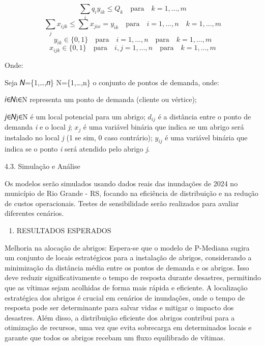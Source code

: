 \documentclass[
]{article}
\providecommand{\tightlist}{%
  \setlength{\itemsep}{0pt}\setlength{\parskip}{0pt}}
\begin{document}
\[\sum_{i}q_{i}y_{ik} \leq Q_{k} \quad \text{para} \quad  k=1, \dots,m\]
\[\sum_{j}x_{ijk} \leq\sum x_{jix}=y_{ik} \quad \text{para}\quad i=1,\dots,n\quad k=1,\dots,m\]
\[y_{ik} \in \{0,1\}\quad\text{para}\quad i=1,\dots,n\quad\text{para}\quad k=1,\dots,m\]
\[x_{ijk} \in \{0,1\}\quad\text{para}\quad i,j=1,\dots,n\quad\text{para}\quad k=1,\dots,m\]

Onde:

Seja 𝑁=\{1,\ldots,𝑛\} N=\{1,\ldots,n\} o conjunto de pontos de demanda,
onde:

𝑖∈𝑁i∈N representa um ponto de demanda (cliente ou vértice);

𝑗∈𝑁j∈N é um local potencial para um abrigo; \(d_{ij}\) é a distância
entre o ponto de demanda \emph{i} e o local \emph{j}; \(x_{j}\) é uma
variável binária que indica se um abrigo será instalado no local
\emph{j} (1 se sim, 0 caso contrário); \(y_{ij}\) é uma variável binária
que indica se o ponto \emph{i} será atendido pelo abrigo \emph{j}.

4.3. Simulação e Análise

Os modelos serão simulados usando dados reais das inundações de 2024 no
município de Rio Grande - RS, focando na eficiência de distribuição e na
redução de custos operacionais. Testes de sensibilidade serão realizados
para avaliar diferentes cenários.

\begin{enumerate}
\def\labelenumi{\arabic{enumi}.}
\setcounter{enumi}{4}
\tightlist
\item
  RESULTADOS ESPERADOS
\end{enumerate}

Melhoria na alocação de abrigos: Espera-se que o modelo de P-Mediana
sugira um conjunto de locais estratégicos para a instalação de abrigos,
considerando a minimização da distância média entre os pontos de demanda
e os abrigos. Isso deve reduzir significativamente o tempo de resposta
durante desastres, permitindo que as vítimas sejam acolhidas de forma
mais rápida e eficiente. A localização estratégica dos abrigos é crucial
em cenários de inundações, onde o tempo de resposta pode ser
determinante para salvar vidas e mitigar o impacto dos desastres. Além
disso, a distribuição eficiente dos abrigos contribui para a otimização
de recursos, uma vez que evita sobrecarga em determinados locais e
garante que todos os abrigos recebam um fluxo equilibrado de vítimas.
\end{document}
